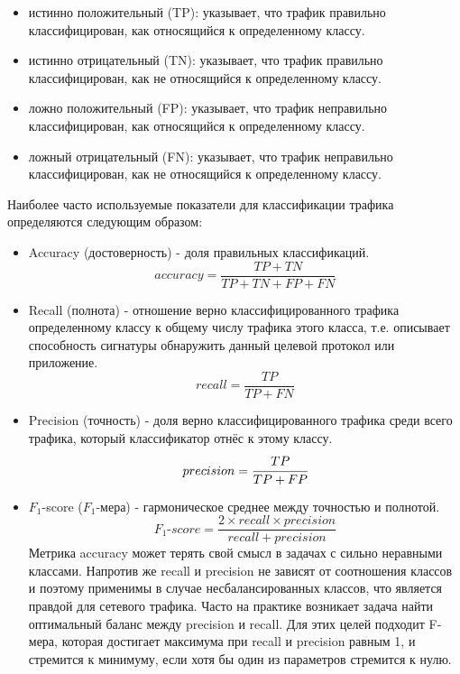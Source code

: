 \begin{itemize}
    \item истинно положительный (TP): указывает, что трафик правильно классифицирован, как относящийся к определенному классу.
    \item истинно отрицательный (TN): указывает, что трафик правильно классифицирован, как не относящийся к определенному классу.
    \item ложно положительный (FP): указывает, что трафик неправильно классифицирован, как относящийся к определенному классу.
    \item ложный отрицательный (FN): указывает, что трафик неправильно классифицирован, как не относящийся к определенному классу.
\end{itemize}

Наиболее часто используемые показатели для классификации трафика определяются следующим образом:

\begin{itemize}
    \item Accuracy (достоверность) - доля правильных классификаций.
    $$ accuracy = \dfrac{TP + TN}{TP + TN + FP + FN} $$

    \item Recall (полнота) - отношение верно классифицированного трафика определенному классу к общему числу трафика этого класса,
    т.е. описывает способность сигнатуры обнаружить данный целевой протокол или приложение.
    $$ recall = \dfrac{TP}{TP + FN} $$

    \item Precision (точность) - доля верно классифицированного трафика среди всего трафика, который классификатор отнёс к этому классу.
    $$ precision = \cfrac{TP}{TP + FP} $$

    \item $F_1$-score ($F_1$-мера) - гармоническое среднее между точностью и полнотой.
     $$ \textit{$F_1$-score} = \dfrac{2 \times recall \times precision}{recall + precision} $$
    Метрика accuracy может терять свой смысл в задачах с сильно неравными классами.
    Напротив же recall и precision не зависят от соотношения классов и поэтому применимы в случае несбалансированных классов,
    что является правдой для сетевого трафика. Часто на практике возникает задача найти оптимальный баланс между precision
    и recall. Для этих целей подходит F-мера, которая достигает максимума при recall
    и precision равным 1, и стремится к минимуму, если хотя бы один из параметров стремится к нулю.


\end{itemize}

